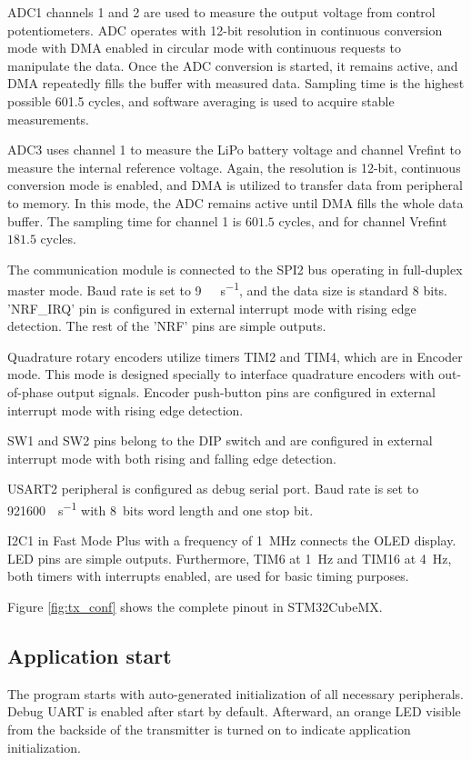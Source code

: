 ADC1 channels 1 and 2 are used to measure the output voltage from control potentiometers. ADC operates with 12-bit resolution in continuous conversion mode with DMA enabled in circular mode with continuous requests to manipulate the data. Once the ADC conversion is started, it remains active, and DMA repeatedly fills the buffer with measured data. Sampling time is the highest possible 601.5 cycles, and software averaging is used to acquire stable measurements.

ADC3 uses channel 1 to measure the LiPo battery voltage and channel Vrefint to measure the internal reference voltage. Again, the resolution is 12-bit, continuous conversion mode is enabled, and DMA is utilized to transfer data from peripheral to memory. In this mode, the ADC remains active until DMA fills the whole data buffer. The sampling time for channel 1 is $601.5$ cycles, and for channel Vrefint $181.5$ cycles.

The communication module is connected to the SPI2 bus operating in full-duplex master mode. Baud rate is set to \SI{9}{\mega\bit\per\second}, and the data size is standard 8 bits. 'NRF\_IRQ' pin is configured in external interrupt mode with rising edge detection. The rest of the 'NRF' pins are simple outputs.

Quadrature rotary encoders utilize timers TIM2 and TIM4, which are in Encoder mode. This mode is designed specially to interface quadrature encoders with out-of-phase output signals. Encoder push-button pins are configured in external interrupt mode with rising edge detection.

SW1 and SW2 pins belong to the DIP switch and are configured in external interrupt mode with both rising and falling edge detection.

USART2 peripheral is configured as debug serial port. Baud rate is set to \SI{921600}{\bit\per\second} with 8~bits word length and one stop bit.

I2C1 in Fast Mode Plus with a frequency of \SI{1}{\MHz} connects the OLED display. LED pins are simple outputs. Furthermore, TIM6 at \SI{1}{\Hz} and TIM16 at \SI{4}{\Hz}, both timers with interrupts enabled, are used for basic timing purposes.

Figure \ref{fig:tx_conf} shows the complete pinout in STM32CubeMX.

\subsection{Application start}
The program starts with auto-generated initialization of all necessary peripherals. Debug UART is enabled after start by default. Afterward, an orange LED visible from the backside of the transmitter is turned on to indicate application initialization.

